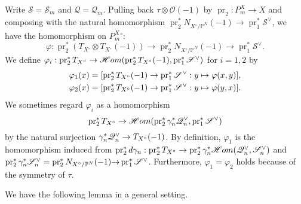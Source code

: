 \documentclass[a4paper,12pt]{amsart}
\theoremstyle{plain}
\theoremstyle{definition}
\begin{document}
Write ${\mathscr{S}} = {\mathscr{S}}_{m}$ and ${\mathscr{Q}} = {\mathscr{Q}}_{m}$.
Pulling back $\tau \otimes {\mathscr{O}}(-1)$ by $\operatorname{pr}_2 : P_m^X {\rightarrow} X$
and composing with the natural homomorphism $\operatorname{pr}_2^* N_{{X{^\circ}}/{\mathbb{P}}^N}(-1) {\rightarrow} \operatorname{pr}_1^* {\mathscr{S}}^{\vee}$,
we have the homomorphism on ${{P_m^{X}}{^\circ}}$: \[
\varphi : \operatorname{pr}_2^* (T_{X{^\circ}} \otimes T_{X{^\circ}} (-1)) {\rightarrow} \operatorname{pr}_2^* N_{{X{^\circ}}/{\mathbb{P}}^N} (-1) {\rightarrow}  \operatorname{pr}_1^* {\mathscr{S}}^{\vee}.
\]
We define $\varphi_i: \operatorname{pr}_2^* T_{X{^\circ}}  \rightarrow  {\mathscr{H}om}(\operatorname{pr}_2^* T_{X{^\circ}}(-1),  \operatorname{pr}_1^*{\mathscr{S}}\spcheck) $ for $i=1,2$ by
\begin{align*}
  \varphi_1(x) &= [\operatorname{pr}_2^* T_{X{^\circ}} (-1)   \rightarrow  \operatorname{pr}_1^*{\mathscr{S}}\spcheck: y \mapsto \varphi(x, y)],\\
  \varphi_2(x) &= [\operatorname{pr}_2^* T_{X{^\circ}} (-1)  \rightarrow  \operatorname{pr}_1^*{\mathscr{S}}\spcheck: y \mapsto \varphi(y, x)].
\end{align*}
We sometimes regard $\varphi_i$ as a homomorphism
\[
\operatorname{pr}_2^* T_{X{^\circ}} \rightarrow {\mathscr{H}om}( \operatorname{pr}_2^* \gamma_n^* {\mathscr{Q}}_n\spcheck ,  \operatorname{pr}_1^*{\mathscr{S}}\spcheck)
\]
by the natural surjection $ \gamma_n^* {\mathscr{Q}}_n \spcheck \rightarrow  T_{X{^\circ}}(-1)$.
By definition,
$\varphi_1$ is the homomorphism induced from
$\operatorname{pr}_2^* d\gamma_n: \operatorname{pr}_2^*T_{X{^\circ}} \rightarrow \operatorname{pr}_2^*\gamma_n^*{\mathscr{H}om}({\mathscr{Q}}_{n}\spcheck, {\mathscr{S}}_{n}\spcheck)$
and $\operatorname{pr}_2^* \gamma_n^* {\mathscr{S}}_n\spcheck = \operatorname{pr}_2^* N_{{X{^\circ}}/{\mathbb{P}}^N}(-1) {\rightarrow} \operatorname{pr}_1^* {\mathscr{S}}^{\vee}$.
Furthermore, $\varphi_1 = \varphi_2$ holds because of the symmetry of $\tau$.

We have the following lemma in a general setting.
\end{document}
